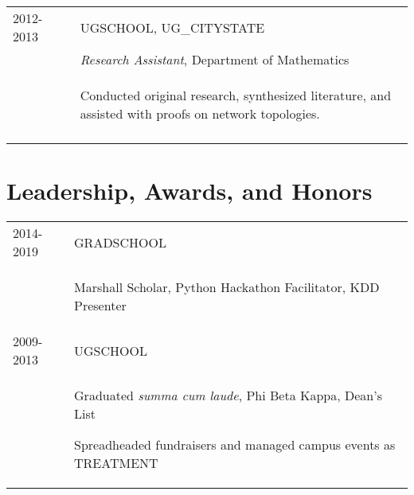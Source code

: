 \documentclass[a4paper,10pt]{article}
\begin{document}
\begin{supertabular}{l p{0.55cm} p{13.9cm}}
	\textsc{2012-2013}		&& \textsc{UGSCHOOL}, UG_CITYSTATE \\
	\textsc{}							&& \small	\emph{Research Assistant}, Department of Mathematics \\
												&& \begin{enumerate*}[label =$\diamond$, itemjoin={\newline}]
														\item \footnotesize Conducted original research, synthesized literature, and assisted with proofs on network topologies.
														\end{enumerate*} \\
	 \\


\end{supertabular}





\section{Leadership, Awards, and Honors}
\begin{supertabular}{p{3.4cm} p{13.9cm}}

\textsc{2014-2019} 					& \textsc{GRADSCHOOL} \\
														& \begin{enumerate*}[label =$\diamond$, itemjoin={\newline}]
																\item \footnotesize Marshall Scholar, Python Hackathon Facilitator, KDD Presenter
																\end{enumerate*} \vspace{2mm} \\

	\textsc{2009-2013} 				& \textsc{UGSCHOOL} \\
														& \begin{enumerate*}[label =$\diamond$, itemjoin={\newline}]
																\item \footnotesize  Graduated \emph{summa cum laude}, Phi Beta Kappa, Dean's List
																\item \footnotesize  Spreadheaded fundraisers and managed campus events as TREATMENT
																\end{enumerate*} \vspace{2mm} \\



\end{supertabular}
\end{document}
